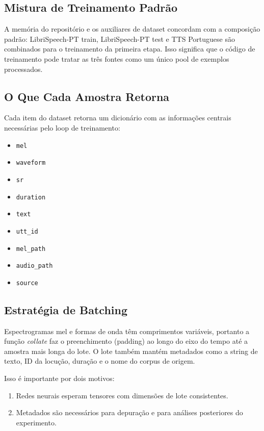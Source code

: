 \documentclass[11pt]{article}
\newcommand{\pathtt}[1]{\texttt{#1}}
\begin{document}
\subsection{Mistura de Treinamento Padrão}

A memória do repositório e os auxiliares de dataset concordam com a composição padrão: LibriSpeech-PT train, LibriSpeech-PT test e TTS Portuguese são combinados para o treinamento da primeira etapa. Isso significa que o código de treinamento pode tratar as três fontes como um único pool de exemplos processados.

\subsection{O Que Cada Amostra Retorna}

Cada item do dataset retorna um dicionário com as informações centrais necessárias pelo loop de treinamento:

\begin{itemize}[leftmargin=1.5em]
  \item \pathtt{mel}
  \item \pathtt{waveform}
  \item \pathtt{sr}
  \item \pathtt{duration}
  \item \pathtt{text}
  \item \pathtt{utt\_id}
  \item \pathtt{mel\_path}
  \item \pathtt{audio\_path}
  \item \pathtt{source}
\end{itemize}

\subsection{Estratégia de Batching}

Espectrogramas mel e formas de onda têm comprimentos variáveis, portanto a função \textit{collate} faz o preenchimento (padding) ao longo do eixo do tempo até a amostra mais longa do lote. O lote também mantém metadados como a string de texto, ID da locução, duração e o nome do corpus de origem.

Isso é importante por dois motivos:

\begin{enumerate}[leftmargin=1.5em]
  \item Redes neurais esperam tensores com dimensões de lote consistentes.
  \item Metadados são necessários para depuração e para análises posteriores do experimento.
\end{enumerate}
\end{document}
